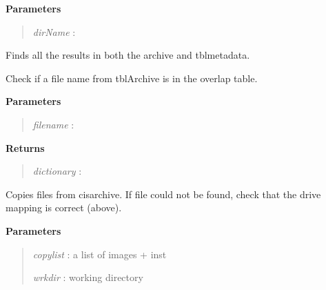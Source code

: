 \documentclass[letterpaper,10pt,english]{sphinxmanual}
\begin{document}
\begin{fulllineitems}
\begin{fulllineitems}
\textbf{Parameters}
\begin{quote}

\emph{dirName} :
\end{quote}

\end{fulllineitems}


\begin{fulllineitems}
\label{code:Database.Database.bothArchiveandMetadata}
Finds all the results in both the archive and tblmetadata.

\end{fulllineitems}


\begin{fulllineitems}
\label{code:Database.Database.checkTblArchiveOverLapsTblMetadata}
Check if a file name from tblArchive is in the overlap table.

\textbf{Parameters}
\begin{quote}

\emph{filename}   :
\end{quote}

\textbf{Returns}
\begin{quote}

\emph{dictionary} :
\end{quote}

\end{fulllineitems}


\begin{fulllineitems}
\label{code:Database.Database.copyfiles}
Copies files from cisarchive.  If file could not be found, check that the 
drive mapping is correct (above).

\textbf{Parameters}
\begin{quote}

\emph{copylist} : a list of images + inst

\emph{wrkdir}   : working directory
\end{quote}

\end{fulllineitems}


\end{fulllineitems}
\end{document}
